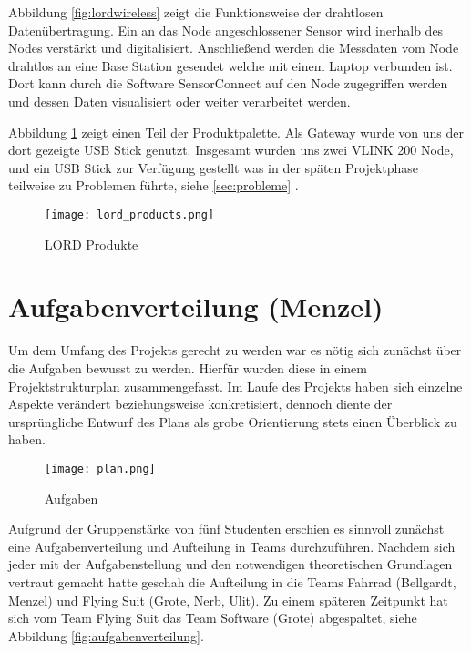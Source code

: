 Abbildung \ref{fig:lordwireless} zeigt die Funktionsweise der drahtlosen Datenübertragung.
Ein an das Node angeschlossener Sensor wird inerhalb des Nodes verstärkt und digitalisiert.
Anschließend werden die Messdaten vom Node drahtlos an eine Base Station gesendet welche mit einem Laptop verbunden ist.
Dort kann durch die Software SensorConnect auf den Node zugegriffen werden und dessen Daten visualisiert oder weiter verarbeitet werden.


Abbildung \ref{fig:lordproducts} zeigt einen Teil der Produktpalette.
Als Gateway wurde von uns der dort gezeigte USB Stick genutzt.
Insgesamt wurden uns zwei VLINK 200 Node, und ein USB Stick zur Verfügung gestellt was in der späten Projektphase teilweise zu Problemen führte,
siehe \ref{sec:probleme} .

\begin{figure}[h]
    \begin{center}
        \texttt{[image: lord\_products.png]}
        \caption[LORD Produkte (Abbildungsverzeichnis)]{LORD Produkte
        \cite{VLInkManual}
        }
        \label{fig:lordproducts}
    \end{center}
\end{figure}

\newpage
\section{Aufgabenverteilung (Menzel)}
Um dem Umfang des Projekts gerecht zu werden war es nötig sich zunächst über die Aufgaben bewusst zu werden.
Hierfür wurden diese in einem Projektstrukturplan zusammengefasst.
Im Laufe des Projekts haben sich einzelne Aspekte verändert beziehungsweise konkretisiert, dennoch diente der ursprüngliche Entwurf des Plans als grobe Orientierung stets einen Überblick zu haben.

\begin{figure}[h]
    \begin{center}
        \texttt{[image: plan.png]}
        \caption[Aufgaben (Abbildungsverzeichnis)]{Aufgaben
        }
        \label{fig:plan}
    \end{center}
\end{figure}


Aufgrund der Gruppenstärke von fünf Studenten erschien es sinnvoll zunächst eine Aufgabenverteilung und Aufteilung in Teams durchzuführen.
Nachdem sich jeder mit der Aufgabenstellung und den notwendigen theoretischen Grundlagen vertraut gemacht hatte geschah die Aufteilung in die Teams Fahrrad (Bellgardt, Menzel) und Flying Suit (Grote, Nerb, Ulit).
Zu einem späteren Zeitpunkt hat sich vom Team Flying Suit das Team Software (Grote) abgespaltet, siehe Abbildung \ref{fig:aufgabenverteilung}.


